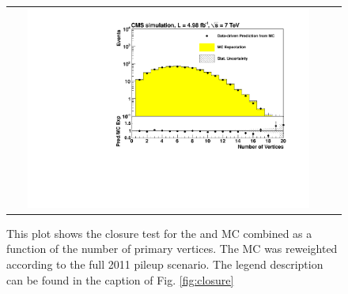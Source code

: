 \begin{figure}[tbhn]
\begin{center}
\begin{tabular}{cc}
\includegraphics[width=0.90\textwidth]{lostlepton/plots/ANplots/Closure_NVertex.pdf}
\end{tabular}
\end{center}
\caption{This plot shows the closure test for the \ttbar and \wpj MC combined as a function of the number of primary vertices. The MC was reweighted according to the full 2011 pileup scenario. The legend description can be found in the caption of Fig. \ref{fig:closure}}
\label{fig:pileup}
\end{figure}
